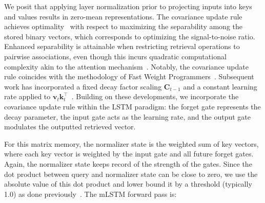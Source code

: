 We posit that applying layer normalization prior to projecting inputs into keys and values results in zero-mean representations. The covariance update rule achieves optimality~\citep{Dayan:91} with respect to maximizing the separability among the stored binary vectors, which corresponds to optimizing the signal-to-noise ratio. Enhanced separability is attainable when restricting retrieval operations to pairwise associations, even though this incurs quadratic computational complexity akin to the attention mechanism~\citep{Krotov:16,Krotov:17,Ramsauer:21}. Notably, the covariance update rule coincides with the methodology of Fast Weight Programmers~\citep{Schmidhuber:92ncfastweights,Schlag:21}. Subsequent work has incorporated a fixed decay factor scaling $\mathbf{C}_{t-1}$ and a constant learning rate applied to $\mathbf{v}_{t} \mathbf{k}_t ^\top$~\citep{Ba:16}. Building on these developments, we incorporate the covariance update rule within the LSTM paradigm: the forget gate represents the decay parameter, the input gate acts as the learning rate, and the output gate modulates the outputted retrieved vector.

For this matrix memory, the normalizer state is the weighted sum of key vectors, where each key vector is weighted by the input gate and all future forget gates. Again, the normalizer state keeps record of the strength of the gates. Since the dot product between query and normalizer state can be close to zero, we use the absolute value of this dot product and lower bound it by a threshold (typically 1.0) as done previously~\citep{Sun:23arxiv}. The mLSTM forward pass is:

